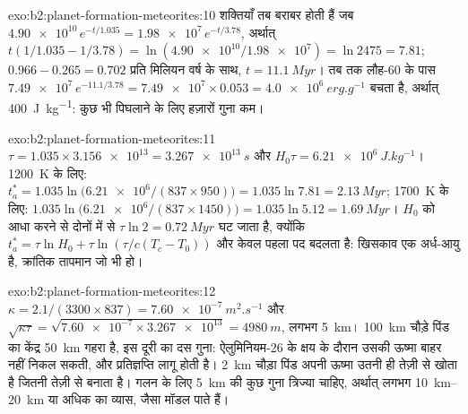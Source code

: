 \begin{solution}{exo:b2:planet-formation-meteorites:10}
शक्तियाँ तब बराबर होती हैं जब $\num{4.90e10}\,e^{-t/1.035} = \num{1.98e7}\,e^{-t/3.78}$,
अर्थात् $t(1/1.035 - 1/3.78) = \ln(\num{4.90e10}/\num{1.98e7}) = \ln 2475 = 7.81$;
$0.966 - 0.265 = 0.702$ प्रति मिलियन वर्ष के साथ, $t = \qty{11.1}{Myr}$। तब तक
लौह-60 के पास $\num{7.49e7}\,e^{-11.1/3.78} = \num{7.49e7}\times0.053 =
\qty{4.0e6}{erg.g^{-1}}$ बचता है, अर्थात् \qty{400}{J.kg^{-1}}: कुछ भी पिघलाने के लिए हज़ारों
गुना कम।
\end{solution}

\begin{solution}{exo:b2:planet-formation-meteorites:11}
$\tau = 1.035\times\num{3.156e13} = \qty{3.267e13}{s}$ और
$H_0\tau = \qty{6.21e6}{J.kg^{-1}}$। \qty{1200}{K} के लिए:
$t_a^* = 1.035\ln\bigl(\num{6.21e6}/(837\times950)\bigr) = 1.035\ln7.81 =
\qty{2.13}{Myr}$; \qty{1700}{K} के लिए: $1.035\ln\bigl(\num{6.21e6}/(837\times1450)\bigr)
= 1.035\ln5.12 = \qty{1.69}{Myr}$। $H_0$ को आधा करने से दोनों में से $\tau\ln2 =
\qty{0.72}{Myr}$ घट जाता है, क्योंकि $t_a^* = \tau\ln H_0 + \tau\ln(\tau/c(T_c -
T_0))$ और केवल पहला पद बदलता है: खिसकाव एक अर्ध-आयु है, क्रांतिक तापमान
जो भी हो।
\end{solution}

\begin{solution}{exo:b2:planet-formation-meteorites:12}
$\kappa = 2.1/(3300\times837) = \qty{7.60e-7}{m^2.s^{-1}}$ और
$\sqrt{\kappa\tau} = \sqrt{\num{7.60e-7}\times\num{3.267e13}} = \qty{4980}{m}$,
लगभग \qty{5}{km}। \qty{100}{km} चौड़े पिंड का केंद्र \qty{50}{km} गहरा है,
इस दूरी का दस गुना: ऐलुमिनियम-26 के क्षय के दौरान उसकी ऊष्मा बाहर नहीं निकल सकती, और
प्रतिज्ञप्ति लागू होती है। \qty{2}{km} चौड़ा पिंड अपनी ऊष्मा उतनी ही तेज़ी से खोता है जितनी तेज़ी से
बनाता है। गलन के लिए \qty{5}{km} की कुछ गुना त्रिज्या चाहिए, अर्थात् लगभग
\qtyrange{10}{20}{km} या अधिक का व्यास, जैसा मॉडल पाते हैं।
\end{solution}


